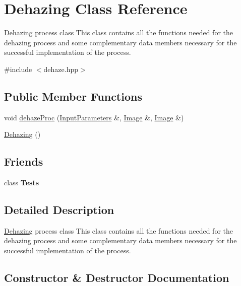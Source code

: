\hypertarget{classDehazing}{}\section{Dehazing Class Reference}
\label{classDehazing}


\mbox{\hyperlink{classDehazing}{Dehazing}} process class This class contains all the functions needed for the dehazing process and some complementary data members necessary for the successful implementation of the process.  




{\ttfamily \#include $<$dehaze.\+hpp$>$}

\subsection*{Public Member Functions}
\begin{DoxyCompactItemize}
\item 
void \mbox{\hyperlink{classDehazing_aed396d0b90fb3be954e88e694fee3431}{dehaze\+Proc}} (\mbox{\hyperlink{classInputParameters}{Input\+Parameters}} \&, \mbox{\hyperlink{classImage}{Image}} \&, \mbox{\hyperlink{classImage}{Image}} \&)
\item 
\mbox{\hyperlink{classDehazing_a29e4ac3dc09c0caff68e7eda287b378d}{Dehazing}} ()
\end{DoxyCompactItemize}
\subsection*{Friends}
\begin{DoxyCompactItemize}
\item 
\mbox{\label{classDehazing_ac1cb630eed1dec7b1ead718c1e2891ba}} 
class {\bfseries Tests}
\end{DoxyCompactItemize}


\subsection{Detailed Description}
\mbox{\hyperlink{classDehazing}{Dehazing}} process class This class contains all the functions needed for the dehazing process and some complementary data members necessary for the successful implementation of the process. 

\subsection{Constructor \& Destructor Documentation}
\mbox{\label{classDehazing_a29e4ac3dc09c0caff68e7eda287b378d}} 

